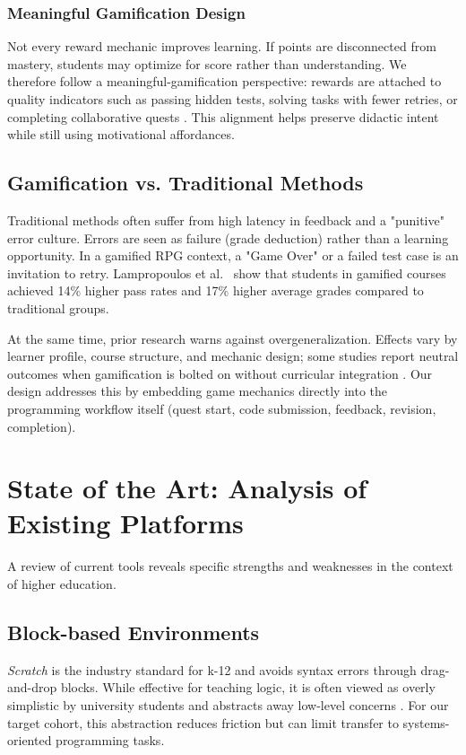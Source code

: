 \documentclass[a4paper, UKenglish, cleveref, autoref, thm-restate]{oasics-v2021}
\begin{document}
\subsubsection{Meaningful Gamification Design}
Not every reward mechanic improves learning. If points are disconnected from mastery, students may optimize for score rather than understanding. We therefore follow a meaningful-gamification perspective: rewards are attached to quality indicators such as passing hidden tests, solving tasks with fewer retries, or completing collaborative quests \cite{nicholson2013meaningful}. This alignment helps preserve didactic intent while still using motivational affordances.

\subsection{Gamification vs. Traditional Methods}
Traditional methods often suffer from high latency in feedback and a "punitive" error culture. Errors are seen as failure (grade deduction) rather than a learning opportunity. In a gamified RPG context, a "Game Over" or a failed test case is an invitation to retry. Lampropoulos et al.~\cite{lampropoulos2024impact} show that students in gamified courses achieved 14\% higher pass rates and 17\% higher average grades compared to traditional groups.

At the same time, prior research warns against overgeneralization. Effects vary by learner profile, course structure, and mechanic design; some studies report neutral outcomes when gamification is bolted on without curricular integration \cite{dicheva2015gamification}. Our design addresses this by embedding game mechanics directly into the programming workflow itself (quest start, code submission, feedback, revision, completion).

\section{State of the Art: Analysis of Existing Platforms}
A review of current tools reveals specific strengths and weaknesses in the context of higher education.

\subsection{Block-based Environments}
\textit{Scratch} is the industry standard for k-12 and avoids syntax errors through drag-and-drop blocks. While effective for teaching logic, it is often viewed as overly simplistic by university students and abstracts away low-level concerns \cite{montiel2021scratch,wen2023scratch}. For our target cohort, this abstraction reduces friction but can limit transfer to systems-oriented programming tasks.
\end{document}
